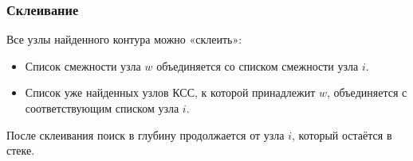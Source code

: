 {\subsubsection*{Склеивание}
Все узлы найденного контура можно «склеить»:
\begin{itemize}
  \item Список смежности узла $w$ объединяется со списком смежности узла $i$.
  \item Список уже найденных узлов КСС, к которой принадлежит $w$, объединяется с соответствующим списком узла $i$.
\end{itemize}

После склеивания поиск в глубину продолжается от узла $i$, который остаётся в стеке.



    \newpage
}
